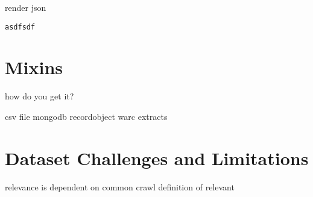 \documentclass[conference]{IEEEtran}
\begin{document}
render json

\begin{lstlisting}
asdfsdf
\end{lstlisting}

\section{Mixins}

how do you get it?

csv file
mongodb recordobject warc extracts




\section{Dataset Challenges and Limitations}






relevance is dependent on common crawl definition of relevant
\end{document}
